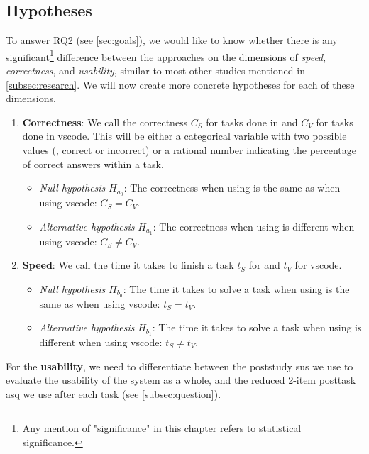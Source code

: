\documentclass[../thesis]{subfiles}
\begin{document}
\subsection{Hypotheses}\label{subsec:hypotheses}

To answer \textsf{RQ2} (see \cref{sec:goals}), we would like to know whether there is any significant\footnote{
	Any mention of "significance" in this chapter refers to statistical significance.
} difference between the approaches on the dimensions of \emph{speed}, \emph{correctness}, and \emph{usability}, similar to most other studies mentioned in \cref{subsec:research}.
We will now create more concrete hypotheses for each of these dimensions.

\begin{enumerate}[label=\alph*)]
	\item \textbf{Correctness}: We call the correctness $C_S$ for tasks done in \SEE{} and $C_V$ for tasks done in \gls{vscode}.
	      This will be either a categorical variable with two possible values (\ie, correct or incorrect) or a rational number indicating the percentage of correct answers within a task.
	      \begin{itemize}
		      \item \emph{Null hypothesis} $H_{a_0}$:
		            The correctness when using \SEE{} is the same as when using \gls{vscode}: $C_S = C_V$.
		      \item \emph{Alternative hypothesis} $H_{a_1}$:
		            The correctness when using \SEE{} is different when using \gls{vscode}: $C_S \neq C_V$.
	      \end{itemize}
	\item \textbf{Speed}: We call the time it takes to finish a task $t_S$ for \SEE{} and $t_V$ for \gls{vscode}.
	      \begin{itemize}
		      \item \emph{Null hypothesis} $H_{b_0}$:
		            The time it takes to solve a task when using \SEE{} is the same as when using \gls{vscode}: $t_S = t_V$.
		      \item \emph{Alternative hypothesis} $H_{b_1}$:
		            The time it takes to solve a task when using \SEE{} is different when using \gls{vscode}: $t_S \neq t_V$.
	      \end{itemize}
\end{enumerate}

For the \textbf{usability}, we need to differentiate between the \gls{poststudy} \gls{sus} we use to evaluate the usability of the system as a whole, and the reduced 2-item \gls{posttask} \gls{asq} we use after each task (see \cref{subsec:question}).
\end{document}
